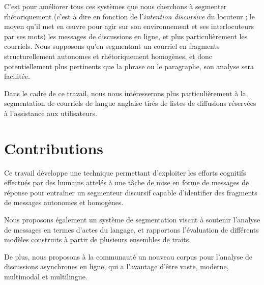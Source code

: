 C'est pour améliorer tous ces systèmes que nous cherchons à segmenter rhétoriquement (c'est à dire en fonction de l'\textit{intention discursive} du locuteur ; le moyen qu'il met en œuvre pour agir sur son environnement et ses interlocuteurs par ses mots) les messages de discussions en ligne, et plus particulièrement les courriels. Nous supposons qu'en segmentant un courriel en fragments structurellement autonomes et rhétoriquement homogènes, et donc potentiellement plus pertinents que la phrase ou le paragraphe, son analyse sera facilitée.

Dans le cadre de ce travail, nous nous intéresserons plus particulièrement à la segmentation de courriels de langue anglaise tirés de listes de diffusions réservées à l'assistance aux utilisateurs.

\section{Contributions}

Ce travail développe une technique permettant d'exploiter les efforts cognitifs effectués par des humains attelés à une tâche de mise en forme de messages de réponse pour entraîner un segmenteur discursif capable d'identifier des fragments de messages autonomes et homogènes.

Nous proposons également un système de segmentation visant à soutenir l'analyse de messages en termes d'actes du langage, et rapportons l'évaluation de différents modèles construits à partir de plusieurs ensembles de traits.

De plus, nous proposons à la communauté un nouveau corpus pour l'analyse de discussions asynchrones en ligne, qui a l'avantage d'être vaste, moderne, multimodal et multilingue.
